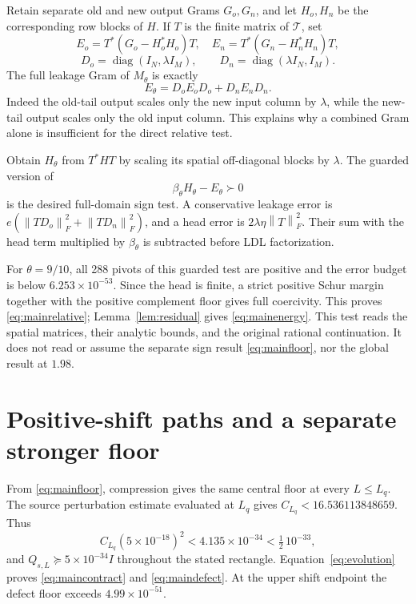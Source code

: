 \documentclass[11pt]{article}
\theoremstyle{remark}\newtheorem{remark}[theorem]{Remark}
\newcommand{\norm}[1]{\left\|#1\right\|}
\begin{document}
Retain separate old and new output Grams $G_o,G_n$, and let $H_o,H_n$ be the corresponding row blocks of $H$. If $T$ is the finite matrix of $\mathcal T$, set
\[
 E_o=T^*(G_o-H_o^*H_o)T,\quad E_n=T^*(G_n-H_n^*H_n)T,
\]
\[
 D_o=\operatorname{diag}(I_N,\lambda I_M),\qquad
 D_n=\operatorname{diag}(\lambda I_N,I_M).
\]
The full leakage Gram of $M_\theta$ is exactly
\begin{equation}\label{eq:Etheta}
 E_\theta=D_oE_oD_o+D_nE_nD_n.
\end{equation}
Indeed the old-tail output scales only the new input column by $\lambda$, while the new-tail output scales only the old input column. This explains why a combined Gram alone is insufficient for the direct relative test.

Obtain $H_\theta$ from $T^*HT$ by scaling its spatial off-diagonal blocks by $\lambda$. The guarded version of
\begin{equation}\label{eq:reltest}
 \beta_\theta H_\theta-E_\theta\succ0
\end{equation}
is the desired full-domain sign test. A conservative leakage error is
$e(\norm{TD_o}_F^2+\norm{TD_n}_F^2)$, and a head error is $2\lambda\eta\norm T_F^2$. Their sum with the head term multiplied by $\beta_\theta$ is subtracted before LDL factorization.

For $\theta=9/10$, all 288 pivots of this guarded test are positive and the error budget is below $6.253\times10^{-53}$. Since the head is finite, a strict positive Schur margin together with the positive complement floor gives full coercivity. This proves \eqref{eq:mainrelative}; Lemma~\ref{lem:residual} gives \eqref{eq:mainenergy}. This test reads the spatial matrices, their analytic bounds, and the original rational continuation. It does not read or assume the separate sign result \eqref{eq:mainfloor}, nor the global result at $1.98$.

\section{Positive-shift paths and a separate stronger floor}\label{sec:shift}

From \eqref{eq:mainfloor}, compression gives the same central floor at every $L\le L_q$. The source perturbation estimate evaluated at $L_q$ gives $C_{L_q}<16.536113848659$. Thus
\[
 C_{L_q}(5\times10^{-18})^2<4.135\times10^{-34}<\tfrac12\,10^{-33},
\]
and $Q_{s,L}\succeq5\times10^{-34}I$ throughout the stated rectangle. Equation~\eqref{eq:evolution} proves \eqref{eq:maincontract} and \eqref{eq:maindefect}. At the upper shift endpoint the defect floor exceeds $4.99\times10^{-51}$.
\end{document}

